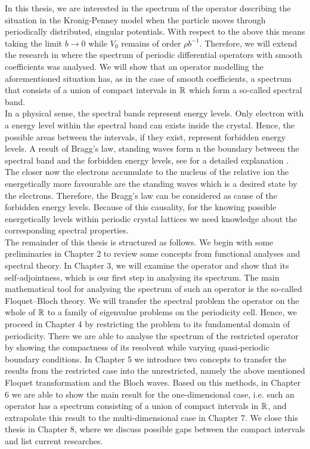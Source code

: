 In this thesis, we are interested in the spectrum of the operator describing the situation in the Kronig-Penney model when the particle moves through periodically distributed, singular potentials. With respect to the above this means taking the limit $b \rightarrow 0$ while $V_{0}$ remains of order $\rho b^{-1}$. Therefore, we will extend the research in \cite{dorfler2011photonic} where the spectrum of periodic differential operators with smooth coefficients was analysed. We will show that an operator modelling the aforementioned situation has, as in the case of smooth coefficients, a spectrum that consists of a union of compact intervals in $\mathbb{R}$ which form a so-called spectral band. 
~\\

In a physical sense, the spectral bands represent energy levels. Only electron with a energy level within the spectral band can exists inside the crystal. Hence, the possible areas between the intervals, if they exist, represent forbidden energy levels. A result of Bragg's law, standing waves form n the boundary between the spectral band and the forbidden energy levels, see for a detailed explanation \cite[section 3.2]{heering2002elektrophysik}. The closer now the electrons accumulate to the nucleus of the relative ion the energetically more favourable are the standing waves which is a desired state by the electrons. Therefore, the Bragg's law can be considered as cause of the forbidden energy levels. Because of this causality, for the knowing possible energetically levels within periodic crystal lattices we need knowledge about the corresponding spectral properties.
~\\

The remainder of this thesis is structured as follows. We begin with some preliminaries in Chapter 2 to review some concepts from functional analyses and spectral theory. In Chapter 3, we will examine the operator and show that its self-adjointness, which is our first step in analysing its spectrum. The main mathematical tool for analysing the spectrum of such an operator is the so-called Floquet–Bloch theory. We will transfer the spectral problem the operator on the whole of $\mathbb{R}$ to a family of eigenvalue problems on the periodicity cell. Hence, we proceed in Chapter 4 by restricting the problem to its fundamental domain of periodicity. There we are able to analyse the spectrum of the restricted operator by showing the compactness of its resolvent while varying quasi-periodic boundary conditions. In Chapter 5 we introduce two concepts to transfer the results from the restricted case into the unrestricted, namely the above mentioned Floquet transformation and the Bloch waves. Based on this methods, in Chapter 6 we are able to show the main result for the one-dimensional case, i.e. such an operator has a spectrum consisting of a union of compact intervals in $\mathbb{R}$, and extrapolate this result to the multi-dimensional case in Chapter 7. We close this thesis in Chapter 8, where we discuss possible gaps between the compact intervals and list current researches.